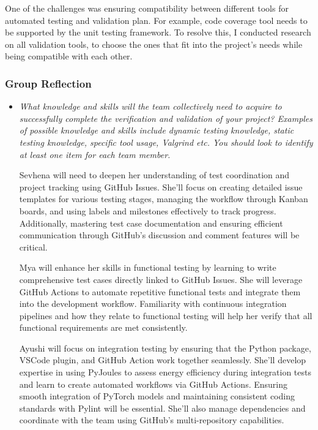 \documentclass[12pt, titlepage]{article}
\begin{document}
\begin{appendices}
\begin{itemize}
        One of the challenges was ensuring compatibility between
        different tools for automated testing and validation plan.
        For example, code coverage tool needs to be supported by the
        unit testing framework. To resolve this, I conducted research
        on all validation tools, to choose the ones that fit into the
        project's needs while being compatible with each other.

    \end{itemize}

    \subsubsection*{Group Reflection}
    \begin{itemize}
      \item \textit{What knowledge and skills will the team
          collectively need to acquire to
          successfully complete the verification and validation of your project?
          Examples of possible knowledge and skills include dynamic
          testing knowledge,
          static testing knowledge, specific tool usage, Valgrind
          etc.  You should look to
        identify at least one item for each team member.\\}

        Sevhena will need to deepen her understanding of test
        coordination and project
        tracking using GitHub Issues. She’ll focus on creating
        detailed issue templates
        for various testing stages, managing the workflow through
        Kanban boards, and using
        labels and milestones effectively to track progress.
        Additionally, mastering test
        case documentation and ensuring efficient communication
        through GitHub’s discussion
        and comment features will be critical.

        Mya will enhance her skills in functional testing by learning
        to write comprehensive
        test cases directly linked to GitHub Issues. She will
        leverage GitHub Actions to
        automate repetitive functional tests and integrate them into
        the development workflow.
        Familiarity with continuous integration pipelines and how
        they relate to functional
        testing will help her verify that all functional requirements
        are met consistently.

        Ayushi will focus on integration testing by ensuring that the
        Python package, VSCode
        plugin, and GitHub Action work together seamlessly. She’ll
        develop expertise in using
        PyJoules to assess energy efficiency during integration tests
        and learn to create
        automated workflows via GitHub Actions. Ensuring smooth
        integration of PyTorch models
        and maintaining consistent coding standards with Pylint will
        be essential. She’ll
        also manage dependencies and coordinate with the team using
        GitHub’s multi-repository
        capabilities.


\end{itemize}
\end{appendices}
\end{document}

